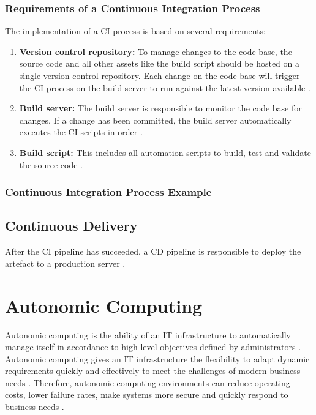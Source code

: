 \subsubsection{Requirements of a Continuous Integration Process}
The implementation of a CI process is based on several requirements:
\begin{enumerate}
\item \textbf{Version control repository:}
To manage changes to the code base, the source code and all other assets like the build script should be hosted on a single version control repository.
Each change on the code base will trigger the CI process on the build server to run against the latest version available \cite{Duvall2007CI}.

\item \textbf{Build server:}
The build server is responsible to monitor the code base for changes.
If a change has been committed, the build server automatically executes the CI scripts in order \cite{Rossel2017CICD, Duvall2007CI}.

\item \textbf{Build script:}
This includes all automation scripts to build, test and validate the source code \cite{Duvall2007CI}.
\end{enumerate}


\subsubsection{Continuous Integration Process Example}


\subsection{Continuous Delivery}
After the CI pipeline has succeeded, a CD pipeline is responsible to deploy the artefact to a production server \cite{Rossel2017CICD}.


\section{Autonomic Computing}
\label{sec:02_ac}
Autonomic computing is the ability of an IT infrastructure to automatically manage itself in accordance to high level objectives defined by administrators \cite{Kephart2003VisionComputing}.
Autonomic computing gives an IT infrastructure the flexibility to adapt dynamic requirements quickly and effectively to meet the challenges of modern business needs \cite{Murch2004Autonomic}. Therefore, autonomic computing environments can reduce operating costs, lower failure rates, make systems more secure and quickly respond to business needs \cite{Jacob2004AutonomicSolution}.


